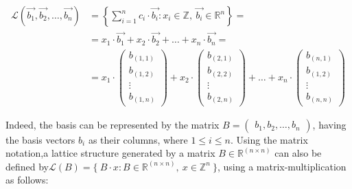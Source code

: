 \documentclass[runningheads]{llncs}
\numberwithin{equation}{section}
\begin{document}
    \begin{equation}
        \begin{split}     
            \mathcal{L}(\Vec{{b}_{1}}, \Vec{{b}_{2}}, \dots, \Vec{{b}_{n}}) & = \left\{ \sum_{i = 1}^{n} {c}_{i} \cdot \Vec{{b}_{i}}: {x}_{i} \in \mathbb{Z},\ \Vec{{b}_{i}} \in {\mathbb{R}}^{n} \right\} = \\
            & = {x}_{1} \cdot \Vec{{b}_{1}} + {x}_{2} \cdot \Vec{{b}_{2}} + \dots + {x}_{n} \cdot \Vec{{b}_{n}} = \\
            & = {x}_{1} \cdot
            \begin{pmatrix} 
                {b}_{(1, 1)} \\ {b}_{(1, 2)} \\ \vdots \\ {b}_{(1, n)}
            \end{pmatrix}
            + {x}_{2} \cdot
            \begin{pmatrix} 
                {b}_{(2, 1)} \\ {b}_{(2, 2)} \\ \vdots \\ {b}_{(2, n)}
            \end{pmatrix}
            + \dots + {x}_{n} \cdot
            \begin{pmatrix}
                {b}_{(n, 1)} \\ {b}_{(1, 2)} \\ \vdots \\ {b}_{(n, n)}
            \end{pmatrix}
        \end{split}
        \label{equ:lattice-structure-definition-1}
    \end{equation}
    \vspace{1ex}

    \newpage
    
    \noindent Indeed, the basis can be represented by the matrix $B = \begin{pmatrix} {b}_{1}, {b}_{2}, \dots, {b}_{n} \end{pmatrix}$, having the basis vectors ${b}_{i}$ as their columns, where $1 \leq i \leq n$. Using the matrix notation,\break a lattice structure generated by a matrix $B \in {\mathbb{R}}^{(n \times n)}$ can also be defined by\break $\mathcal{L}(B) = \{\ B \cdot x: B \in {\mathbb{R}}^{(n \times n)},\ x \in {\mathbb{Z}}^{n}\ \}$, using a matrix-multiplication as follows:
\end{document}
